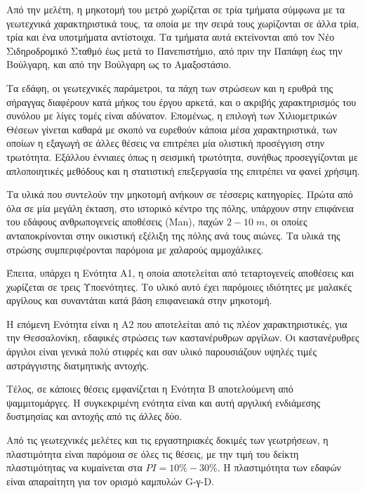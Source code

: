 Από την μελέτη, η μηκοτομή του μετρό χωρίζεται σε τρία τμήματα σύμφωνα με τα γεωτεχνικά χαρακτηριστικά τους, τα οποία με την σειρά τους χωρίζονται σε άλλα τρία, τρία και ένα υποτμήματα αντίστοιχα. Τα τμήματα αυτά εκτείνονται από τον Νέο Σιδηροδρομικό Σταθμό έως μετά το Πανεπιστήμιο, από πριν την Παπάφη έως την Βούλγαρη, και από την Βούλγαρη ως το Αμαξοστάσιο.

Τα εδάφη, οι γεωτεχνικές παράμετροι, τα πάχη των στρώσεων και η ερυθρά της σήραγγας διαφέρουν κατά μήκος του έργου αρκετά, και ο ακριβής χαρακτηρισμός του συνόλου με λίγες τομές είναι αδύνατον. Επομένως, η επιλογή των Χιλιομετρικών Θέσεων γίνεται καθαρά με σκοπό να ευρεθούν κάποια μέσα χαρακτηριστικά, των οποίων η εξαγωγή σε άλλες θέσεις να επιτρέπει μία ολιστική προσέγγιση στην τρωτότητα. Εξάλλου έννιαιες όπως η σεισμική τρωτότητα, συνήθως προσεγγίζονται με απλοποιητικές μεθόδους και η στατιστική επεξεργασία της επιτρέπει να φανεί χρήσιμη.

Τα υλικά που συντελούν την μηκοτομή ανήκουν σε τέσσερις κατηγορίες. Πρώτα από όλα σε μία μεγάλη έκταση, στο ιστορικό κέντρο της πόλης, υπάρχουν στην επιφάνεια του εδάφους ανθρωπογενείς αποθέσεις (Man), παχών $2-10\;m$, οι οποίες ανταποκρίνονται στην οικιστική εξέλιξη της πόλης ανά τους αιώνες. Τα υλικά της στρώσης συμπεριφέρονται παρόμοια με χαλαρούς αμμοχάλικες.

Έπειτα, υπάρχει η Ενότητα Α1, η οποία αποτελείται από τεταρτογενείς αποθέσεις και χωρίζεται σε τρεις Υποενότητες. Το υλικό αυτό έχει παρόμοιες ιδιότητες με μαλακές αργίλους και συναντάται κατά βάση επιφανειακά στην μηκοτομή.

Η επόμενη Ενότητα είναι η Α2 που αποτελείται από τις πλέον χαρακτηριστικές, για την Θεσσαλονίκη, εδαφικές στρώσεις των καστανέρυθρων αργίλων. Οι καστανέρυθρες άργιλοι είναι γενικά πολύ στιφρές και σαν υλικό παρουσιάζουν υψηλές τιμές αστράγγιστης διατμητικής αντοχής.

Τέλος, σε κάποιες θέσεις εμφανίζεται η Ενότητα Β αποτελούμενη από ψαμμιτομάργες. Η συγκεκριμένη ενότητα είναι και αυτή αργιλική ενδιάμεσης δυστμησίας και αντοχής από τις άλλες δύο.

Από τις γεωτεχνικές μελέτες και τις εργαστηριακές δοκιμές των γεωτρήσεων, η πλαστιμότητα είναι παρόμοια σε όλες τις θέσεις, με την τιμή του δείκτη πλαστιμότητας να κυμαίνεται στα $PI = 10\%-30\%$. Η πλαστιμότητα των εδαφών είναι απαραίτητη για τον ορισμό καμπυλών G-γ-D.


